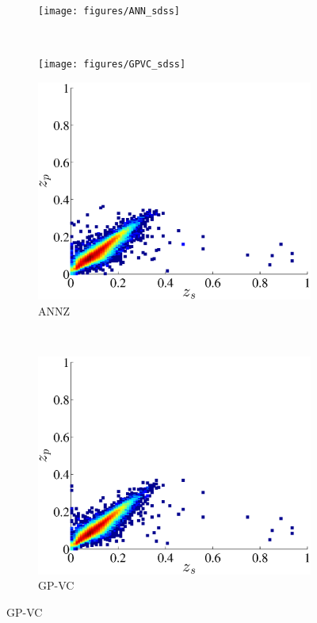\documentclass[useAMS,usenatbib,fleqn]{mn2e}
\begin{document}
\begin{figure}
        \centering
       
       \begin{subfigure}[b]{0.35\textwidth}
                \texttt{[image: figures/ANN\_sdss]}
        \end{subfigure}
        ~ 
        \begin{subfigure}[b]{0.35\textwidth}
                \texttt{[image: figures/GPVC\_sdss]}
        \end{subfigure}

        
        \begin{subfigure}[b]{0.35\textwidth}
                \includegraphics[width=\columnwidth]{figures/ANN_sdss_cut}
        \caption{{\sc ANNZ}}
        \end{subfigure}
	~ 
        \begin{subfigure}[b]{0.35\textwidth}
                \includegraphics[width=\columnwidth]{figures/GPVC_sdss_cut}
        \caption{GP-VC}
        \end{subfigure}


\end{figure}
\end{document}
